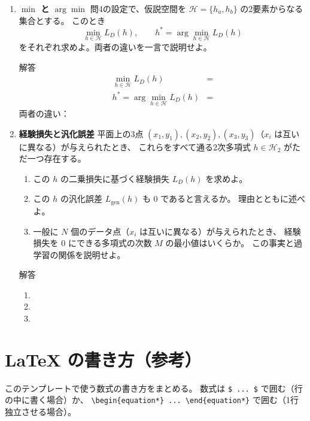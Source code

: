 \documentclass[a4paper,dvipdfmx]{jsarticle}
\newcommand{\学籍番号}{0000000}
\newcommand{\氏名}{氏名を書く}
\newcommand{\提出日}{2026年10月1日}
\newenvironment{answer}{\begin{itembox}[l]{解答}}{\end{itembox}}
\begin{document}
\begin{enumerate}
  \item \textbf{$\min$ と $\arg\min$}\quad
    問4の設定で、仮説空間を $\mathcal{H} = \{h_a, h_b\}$ の2要素からなる集合とする。
    このとき
    \begin{equation*}
      \min_{h \in \mathcal{H}} L_D(h), \qquad h^* = \arg\min_{h \in \mathcal{H}} L_D(h)
    \end{equation*}
    をそれぞれ求めよ。両者の違いを一言で説明せよ。
    \begin{answer}
      \begin{align*}
        \min_{h \in \mathcal{H}} L_D(h) &= \\
        h^* = \arg\min_{h \in \mathcal{H}} L_D(h) &=
      \end{align*}
      両者の違い：
    \end{answer}

  \item \textbf{経験損失と汎化誤差}\quad
    平面上の3点 $(x_1, y_1), (x_2, y_2), (x_3, y_3)$（$x_i$ は互いに異なる）が与えられたとき、
    これらをすべて通る2次多項式 $h \in \mathcal{H}_2$ がただ一つ存在する。
    \begin{enumerate}
      \item この $h$ の二乗損失に基づく経験損失 $L_D(h)$ を求めよ。
      \item この $h$ の汎化誤差 $L_{\mathrm{gen}}(h)$ も $0$ であると言えるか。
        理由とともに述べよ。
      \item 一般に $N$ 個のデータ点（$x_i$ は互いに異なる）が与えられたとき、
        経験損失を $0$ にできる多項式の次数 $M$ の最小値はいくらか。
        この事実と過学習の関係を説明せよ。
    \end{enumerate}
    \begin{answer}
      \begin{enumerate}
        \item
        \item
        \item
      \end{enumerate}
    \end{answer}
\end{enumerate}

\clearpage
\section*{LaTeX の書き方（参考）}

このテンプレートで使う数式の書き方をまとめる。
数式は \verb|$ ... $| で囲む（行の中に書く場合）か、
\verb|\begin{equation*} ... \end{equation*}| で囲む（1行独立させる場合）。
\end{document}
